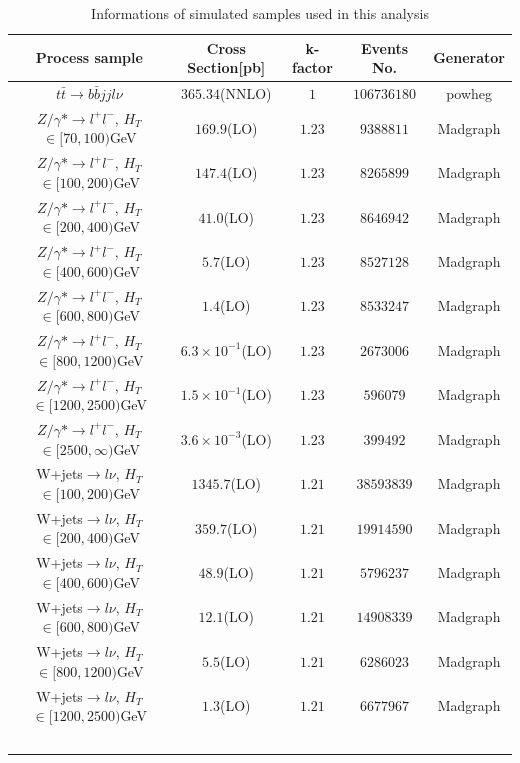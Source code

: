 		\begin{center}
		\begin{longtable}{ c c c c c }
		\caption{Informations of simulated samples used in this analysis} \\
		\hline
		Process sample & Cross Section[pb] & k-factor & Events No. & Generator \\ 
		\hline
		$t$$\bar{t}\rightarrow b \bar{b}jjl\nu$ & $365.34$(NNLO) & $1$ & $106736180$ & powheg \\
		\hline
		$Z / \gamma * \rightarrow l^+ l^-$, $H_{T}$ $\in [70,100)$GeV & $169.9$(LO) & $1.23$ & $9388811$ & Madgraph \\
		$Z / \gamma * \rightarrow l^+ l^-$, $H_{T}$ $\in [100,200)$GeV & $147.4$(LO) & $1.23$ & $8265899$ & Madgraph \\
		$Z / \gamma * \rightarrow l^+ l^-$, $H_{T}$ $\in [200,400)$GeV & $41.0$(LO) & $1.23$ & $8646942$ & Madgraph \\
		$Z / \gamma * \rightarrow l^+ l^-$, $H_{T}$ $\in [400,600)$GeV & $5.7$(LO) & $1.23$ & $8527128$ & Madgraph \\
		$Z / \gamma * \rightarrow l^+ l^-$, $H_{T}$ $\in [600,800)$GeV & $1.4$(LO) & $1.23$ & $8533247$ & Madgraph \\
		$Z / \gamma * \rightarrow l^+ l^-$, $H_{T}$ $\in [800,1200)$GeV & $6.3 \times 10^{-1}$(LO) & $1.23$ & $2673006$ & Madgraph \\
		$Z / \gamma * \rightarrow l^+ l^-$, $H_{T}$ $\in [1200,2500)$GeV & $1.5 \times 10^{-1}$(LO) & $1.23$ & $596079$ & Madgraph \\
		$Z / \gamma * \rightarrow l^+ l^-$, $H_{T}$ $\in [2500, \infty )$GeV & $3.6 \times 10^{-3}$(LO) & $1.23$ & $399492$ & Madgraph \\
		\hline
		W+jets$\rightarrow l \nu$, $H_{T}$ $\in [100,200)$GeV & $1345.7$(LO) & $1.21$ & $38593839$ & Madgraph \\
		W+jets$\rightarrow l \nu$, $H_{T}$ $\in [200,400)$GeV & $359.7$(LO) & $1.21$ & $19914590$ & Madgraph \\
		W+jets$\rightarrow l \nu$, $H_{T}$ $\in [400,600)$GeV & $48.9$(LO) & $1.21$ & $5796237$ & Madgraph \\
		W+jets$\rightarrow l \nu$, $H_{T}$ $\in [600,800)$GeV & $12.1$(LO) & $1.21$ & $14908339$ & Madgraph \\
		W+jets$\rightarrow l \nu$, $H_{T}$ $\in [800,1200)$GeV & $5.5$(LO) & $1.21$ & $6286023$ & Madgraph \\
		W+jets$\rightarrow l \nu$, $H_{T}$ $\in [1200,2500)$GeV & $1.3$(LO) & $1.21$ & $6677967$ & Madgraph \\
$$
\end{longtable}
\end{center}
